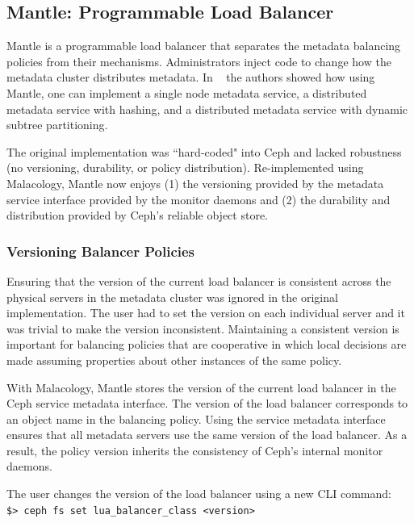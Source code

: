 \documentclass[preprint]{sigplanconf-eurosys}
\begin{document}
\subsection{Mantle: Programmable Load Balancer}
\label{sec:mantle}

Mantle is a programmable load balancer that separates the metadata balancing
policies from their mechanisms. Administrators inject code to change how the
metadata cluster distributes metadata. In ~\cite{sevilla:sc15-mantle} the
authors showed how using Mantle, one can implement a single node metadata
service, a distributed metadata service with hashing, and a distributed
metadata service with dynamic subtree partitioning. 

The original implementation was ``hard-coded" into Ceph and lacked robustness
(no versioning, durability, or policy distribution).  Re-implemented using
Malacology, Mantle now enjoys (1) the versioning provided by the metadata
service interface provided by the monitor daemons and (2) the durability and
distribution provided by Ceph's reliable object store.  

\subsubsection{Versioning Balancer Policies}

Ensuring that the version of the current load balancer is consistent across the
physical servers in the metadata cluster was ignored in the original
implementation. The user had to set the version on each individual server and
it was trivial to make the version inconsistent. Maintaining a consistent
version is important for balancing policies that are cooperative in which local
decisions are made assuming properties about other instances of the same
policy.

With Malacology, Mantle stores the version of the current load balancer in the
Ceph service metadata interface. The version of the load balancer corresponds
to an object name in the balancing policy. Using the service metadata interface
ensures that all metadata servers use the same version of the load balancer. As
a result, the policy version inherits the consistency of Ceph's internal
monitor daemons.

The user changes the version of the load balancer using a new CLI command: \\

\noindent \texttt{\$> ceph fs\ set\ lua\_balancer\_class\ \textless{}version\textgreater{}}
\end{document}

